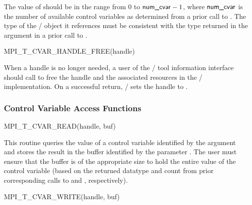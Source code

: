 The value of  should be in the range from $0$ to
$\mpiarg{num\_cvar}-1$, where $\mpiarg{num\_cvar}$ is the number of available control
variables as determined from a prior call to
.  The type of the \MPI/ object it
references must be consistent with the type returned in the 
argument in a prior call to .

\begin{funcdef}{MPI\_T\_CVAR\_HANDLE\_FREE}{(\mbox{handle})}
\end{funcdef}

When a handle is no longer needed, a user of the \MPI/ tool information
interface should call  to free the
handle and the associated resources in the \MPI/ implementation.  On a
successful return, \MPI/ sets the handle to
.


\subsubsection{Control Variable Access Functions}

\begin{funcdef}{MPI\_T\_CVAR\_READ}{(\mbox{handle}, \mbox{buf})}
\end{funcdef}

This routine queries the value of a control variable identified by the
argument  and stores the result in the buffer identified by
the parameter .  The user must ensure that the buffer is of the
appropriate size to hold the entire value of the control variable (based on
the returned datatype and count from prior corresponding calls to
 and
, respectively).

\begin{funcdef}{MPI\_T\_CVAR\_WRITE}{(\mbox{handle}, \mbox{buf})}
\end{funcdef}

